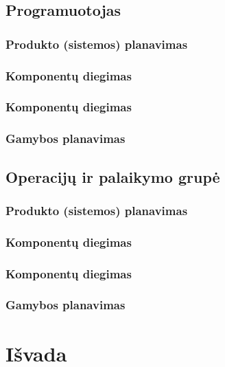 \documentclass{VUMIFPSkursinis}
\begin{document}
\subsection{Programuotojas}
\subsubsection{Produkto (sistemos) planavimas}
\subsubsection{Komponentų diegimas}
\subsubsection{Komponentų diegimas}
\subsubsection{Gamybos planavimas}
\subsection{Operacijų ir palaikymo grupė}
\subsubsection{Produkto (sistemos) planavimas}
\subsubsection{Komponentų diegimas}
\subsubsection{Komponentų diegimas}
\subsubsection{Gamybos planavimas}

\section{Išvada}
\end{document}
